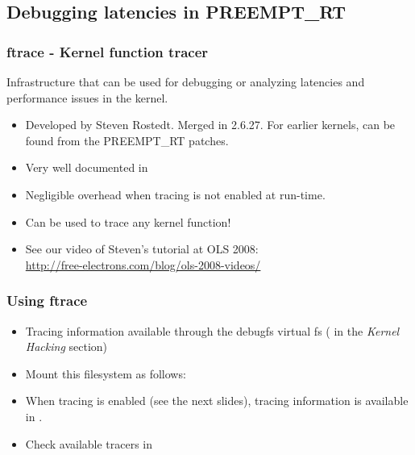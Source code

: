 \subsection{Debugging latencies in PREEMPT\_RT}

\begin{frame}
  \frametitle{ftrace - Kernel function tracer}

  Infrastructure that can be used for debugging or analyzing latencies
  and performance issues in the kernel.

  \begin{itemize}
  \item Developed by Steven Rostedt. Merged in 2.6.27. For earlier
    kernels, can be found from the PREEMPT\_RT patches.
  \item Very well documented in 
  \item Negligible overhead when tracing is not enabled at run-time.
  \item Can be used to trace any kernel function!
  \item See our video of Steven's tutorial at OLS 2008:\\
    \url{http://free-electrons.com/blog/ols-2008-videos/}
  \end{itemize}
\end{frame}

\begin{frame}
  \frametitle{Using ftrace}
  \begin{itemize}
  \item Tracing information available through the debugfs virtual fs
    ( in the {\em Kernel Hacking} section)
  \item Mount this filesystem as follows:\\
  \item When tracing is enabled (see the next slides), tracing
    information is available in .
  \item Check available tracers in
  \end{itemize}
\end{frame}

